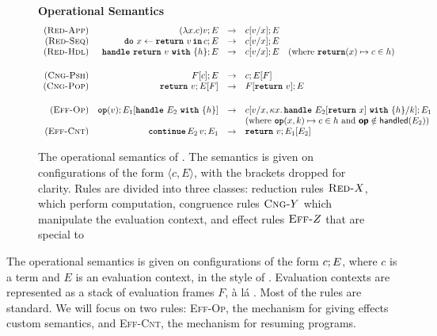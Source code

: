 \begin{figure}[ht]
\begin{eff-desc}
{\noindent\textbf{Operational Semantics}}
  {\scriptsize
\[
  \begin{array}{rrcl}
  \reductionRule{App} & \transition{\effconfiguration{(\function{x}{c})v}{E}}{\effconfiguration{c[v/x]}{E}}\\
  \reductionRule{Seq} & \transition{\effconfiguration{\bind{x}{\return{v}}{c}}{E}}{\effconfiguration{c[v/x]}{E}}\\
  \reductionRule{Hdl} & \transition{\effconfiguration{\handleWith{\return{v}}{h}}{E}}{\effconfiguration{c[v/x]}{E}} \quad (\text{where $\returnHandler{x}{c} \in h$)}\\
  \vspace{1mm} \\ 
  \congruenceRule{Psh} & \transition{\effconfiguration{F[c]}{E}}{\effconfiguration{c}{E[F]}} \\
  \congruenceRule{Pop} & \transition{\effconfiguration{\return{v}}{E[F]}}{\effconfiguration{F[\return{v}]}{E}}\\
  \vspace{1mm} \\
  \effectRule{Op} & \transition{\effconfiguration{\op{v}}{E_1[\handleWith{E_2}{h}]}}\effconfiguration{c[v/x, \kappa x. \, \handleWith{E_2[\return{x}]}{h} / k]}{E_1}\\
  &&& \text{(where $\opHandler{x}{k}{c} \in h$ and $\textbf{\textsf{op}} \notin \textsf{handled}(E_2)$)}\\
  \effectRule{Cnt} & \transition{\effconfiguration{\continue{E_2}{v}}{E_1}}{\effconfiguration{\return{v}}{E_1[E_2]}}

\end{array}
\]
  }
\end{eff-desc}
\caption{The operational semantics of \efflang. The semantics is given on configurations of the form $\langle c, E \rangle$, with the brackets dropped for clarity. Rules are divided into three classes: reduction rules $\textsc{Red-}X$, which perform computation, congruence rules $\textsc{Cng-}Y$ which manipulate the evaluation context, and effect rules $\textsc{Eff-}Z$ that are special to \efflang}
\label{fig:efflang-opsem}
\end{figure}

The operational semantics is given on configurations of the form ${c}; {E}$, where $c$ is a term and $E$ is an evaluation context, in the style of \citet{felleisen-87}. Evaluation contexts are represented as a stack of evaluation frames $F$, à lá \citet{kiselyov-2012}. Most of the rules are standard. We will focus on two rules: \textsc{Eff-Op}, the mechanism for giving effects custom semantics, and \textsc{Eff-Cnt}, the mechanism for resuming programs. 

